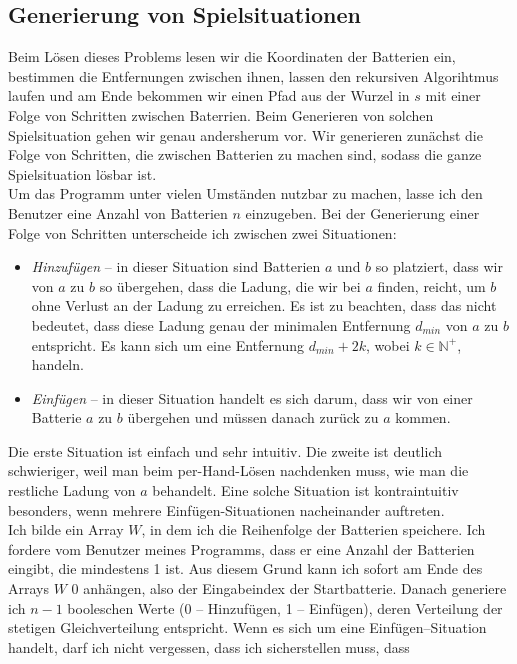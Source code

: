 \documentclass[a4paper,10pt,ngerman]{scrartcl}
\begin{document}
\subsection{Generierung von Spielsituationen}
Beim Lösen dieses Problems lesen wir die Koordinaten der Batterien ein, bestimmen die Entfernungen zwischen ihnen,
lassen den rekursiven Algorihtmus laufen und am Ende bekommen wir einen Pfad aus der Wurzel in $s$ mit einer Folge von
Schritten zwischen Baterrien. Beim Generieren von solchen Spielsituation gehen wir genau andersherum vor.
Wir generieren zunächst die Folge von Schritten, die zwischen Batterien zu machen sind, sodass die ganze 
Spielsituation lösbar ist.\\
Um das Programm unter vielen Umständen nutzbar zu machen, lasse ich den Benutzer eine Anzahl von Batterien $n$ einzugeben.
Bei der Generierung einer Folge von Schritten unterscheide ich zwischen zwei Situationen:
\begin{itemize}
  \item \textit{Hinzufügen} -- in dieser Situation sind Batterien $a$ und $b$ so platziert, 
    dass wir von $a$ zu $b$ so übergehen, dass die Ladung, die wir bei $a$ finden, reicht, um $b$ ohne Verlust an der Ladung
    zu erreichen. Es ist zu beachten, dass das nicht bedeutet, dass diese Ladung genau der minimalen Entfernung $d_{min}$ von $a$ zu $b$ entspricht.
    Es kann sich um eine Entfernung $d_{min}+2k$, wobei $k \in \mathbb{N^{+}}$, handeln.
  \item \textit{Einfügen} -- in dieser Situation handelt es sich darum, dass wir von einer Batterie $a$ zu $b$ übergehen und müssen danach
   zurück zu $a$ kommen.
\end{itemize}
Die erste Situation ist einfach und sehr intuitiv. Die zweite ist deutlich schwieriger, weil man beim per-Hand-Lösen nachdenken muss,
wie man die restliche Ladung von $a$ behandelt. Eine solche Situation ist kontraintuitiv besonders, wenn mehrere Einfügen-Situationen
nacheinander auftreten.\\
Ich bilde ein Array $W$, in dem ich die Reihenfolge der Batterien speichere.
Ich fordere vom Benutzer meines Programms, dass er eine Anzahl der Batterien eingibt, die mindestens 1 ist.
Aus diesem Grund kann ich sofort am Ende des Arrays $W$ 0 anhängen, also der Eingabeindex der Startbatterie.
Danach generiere ich $n-1$ booleschen Werte (0 -- Hinzufügen, 1 -- Einfügen), deren Verteilung der stetigen Gleichverteilung entspricht.
Wenn es sich um eine Einfügen--Situation handelt, darf ich nicht vergessen, dass ich sicherstellen muss, dass
\end{document}
